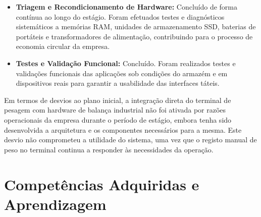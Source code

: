 \begin{itemize}
    \item \textbf{Triagem e Recondicionamento de Hardware:} Concluído de forma contínua ao longo do estágio. Foram efetuados testes e diagnósticos sistemáticos a memórias \ac{RAM}, unidades de armazenamento \ac{SSD}, baterias de portáteis e transformadores de alimentação, contribuindo para o processo de economia circular da empresa.

    \item \textbf{Testes e Validação Funcional:} Concluído. Foram realizados testes e validações funcionais das aplicações sob condições do armazém e em dispositivos reais para garantir a usabilidade das interfaces táteis.
\end{itemize}

Em termos de desvios ao plano inicial, a integração direta do terminal de pesagem com hardware de balança industrial não foi ativada por razões operacionais da empresa durante o período de estágio, embora tenha sido desenvolvida a arquitetura e os componentes necessários para a mesma. Este desvio não comprometeu a utilidade do sistema, uma vez que o registo manual de peso no terminal continua a responder às necessidades da operação.

\section{Competências Adquiridas e Aprendizagem}

